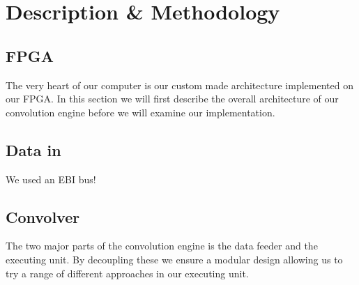 \chapter{Description \& Methodology}

\section{FPGA}

The very heart of our computer is our custom made architecture implemented on our FPGA.
In this section we will first describe the overall architecture of our convolution engine before we will examine our implementation.

\section{Data in}

We used an EBI bus!

\section{Convolver}

The two major parts of the convolution engine is the data feeder and the executing unit. By decoupling these we ensure a modular design allowing us to try a range of different approaches in our executing unit.

